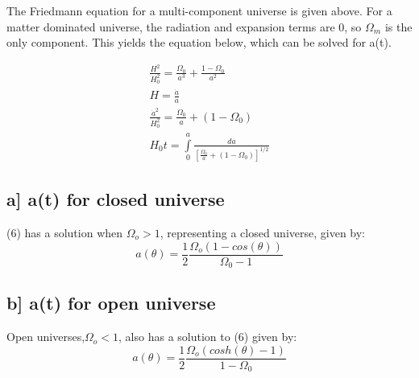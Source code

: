 \documentclass[a4paper,11pt]{article}
\begin{document}
The Friedmann equation for a multi-component universe is given above.  For a matter dominated universe, the radiation and expansion terms are 0, so $\Omega_{m}$ is the only component.  This yields the equation below, which can be solved for a(t).

\begin{eqnarray}
\frac{H^2}{H_0^2}=\frac{\Omega_{0}}{a^3}+\frac{1-\Omega_0}{a^2} \nonumber \\
H=\frac{\dot{a}}{a}  \nonumber \\
\frac{\dot{a}^2}{H_0^2}=\frac{\Omega_{0}}{a}+(1-\Omega_0) \nonumber \\
H_0t=\int\limits_0^a \frac{da}{[\frac{\Omega_{0}}{a}+(1-\Omega_0)]^{1/2}}
\end{eqnarray}

\subsection*{a] a(t) for closed universe}
(6) has a solution when $\Omega_o > 1$, representing a closed universe, given by:
\begin{equation}
a(\theta)=\frac{1}{2}\frac{\Omega_o (1-cos(\theta))}{\Omega_0-1}
\end{equation}

\subsection*{b] a(t) for open universe}
Open universes,$\Omega_o < 1$, also has a solution to (6) given by:
\begin{equation}
a(\theta)=\frac{1}{2}\frac{\Omega_o (cosh(\theta)-1)}{1-\Omega_0}
\end{equation}
\end{document}
